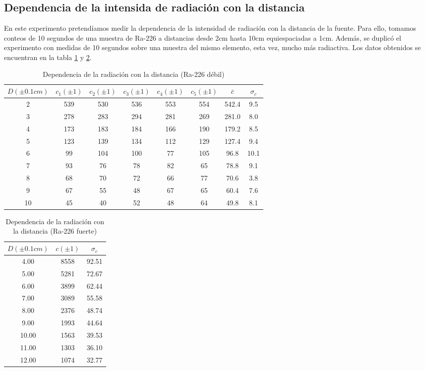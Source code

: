 \documentclass[%
 reprint,
 amsmath,amssymb,
 aps,
]{revtex4-1}
\begin{document}
\subsection{\label{sec:level2}Dependencia de la intensida de radiación con la distancia}
En este experimento pretendíamos medir la dependencia de la intensidad de radiación con la distancia de la fuente. Para ello, tomamos conteos de 10 segundos de una muestra de Ra-226 a distancias desde 2cm hasta 10cm equiespaciadas a 1cm. Además, se duplicó el experimento con medidas de 10 segundos sobre una muestra del mismo elemento, esta vez, mucho más radiactiva. Los datos obtenidos se encuentran en la tabla \ref{table:distancia} y \ref{table:fuerte}.\\


\begin{table}[h!]
\centering
\begin{tabular}{|c|c|c|c|c|c|c|c|}
	\hline $D(\pm0.1cm)$& $c_1(\pm1)$ & $c_2(\pm1)$ & $c_3(\pm1)$& $c_4(\pm1)$& $c_5(\pm1)$& $\bar{c}$ & $\sigma_c$\\
	\hline\hline
	2 & 539 & 530 & 536 & 553 & 554 & 542.4 & 9.5\\
	3 & 278 & 283 & 294 & 281 & 269 & 281.0 & 8.0\\
	4 & 173 & 183 & 184 & 166 & 190 & 179.2 & 8.5\\
	5 & 123 & 139 & 134 & 112 & 129 & 127.4 & 9.4\\
	6 & 99  & 104 & 100 & 77  & 105 & 96.8  & 10.1\\
	7 & 93  & 76  & 78  & 82  & 65  & 78.8  & 9.1\\
	8 & 68  & 70  & 72  & 66  & 77  & 70.6  & 3.8\\
	9 & 67  & 55  & 48  & 67  & 65  & 60.4  & 7.6\\
	10& 45  & 40  & 52  & 48  & 64  & 49.8  & 8.1\\
	[1ex] 
 \hline
 \end{tabular} 
  \caption{Dependencia de la radiación con la distancia (Ra-226 débil)}
\label{table:distancia} 
\end{table}

\begin{table}[h!]
\centering
\begin{tabular}{|c|c|c|}
	\hline $D(\pm0.1cm)$& $c(\pm1)$& $\sigma_c$\\
	\hline\hline
	4.00&8558&92.51\\
	5.00&5281&72.67\\
	6.00&3899&62.44\\
	7.00&3089&55.58\\
	8.00&2376&48.74\\
	9.00&1993&44.64\\
	10.00&1563&39.53\\
	11.00&1303&36.10\\
	12.00&1074&32.77\\
	[1ex] 
	\hline
 \end{tabular} 
  \caption{Dependencia de la radiación con la distancia (Ra-226 fuerte)}
\label{table:fuerte} 
\end{table}
\end{document}
